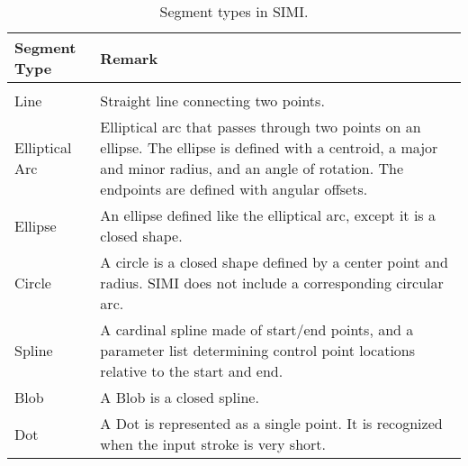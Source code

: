
\begin{table}%
\centering
\begin{tabular}{l | p{12cm}}
\textbf{Segment Type} & \textbf{Remark} \\
\hline
\\

Line &

Straight line connecting two points.

\\

Elliptical Arc &

Elliptical arc that passes through two points on an ellipse. The
ellipse is defined with a centroid, a major and minor radius, and an
angle of rotation. The endpoints are defined with angular offsets.

\\

Ellipse &

An ellipse defined like the elliptical arc, except it is a closed
shape.  

\\ 

Circle &

A circle is a closed shape defined by a center point and radius. SIMI
does not include a corresponding circular arc.

\\ 

Spline &

A cardinal spline made of start/end points, and a parameter list
determining control point locations relative to the start and end.

\\ 

Blob &

A Blob is a closed spline.

\\ 

Dot &

A Dot is represented as a single point. It is recognized when the
input stroke is very short.

\\ \hline

\end{tabular}
\caption[Segment types]{Segment types in SIMI.}
\label{tab:segment-types}
\end{table}
